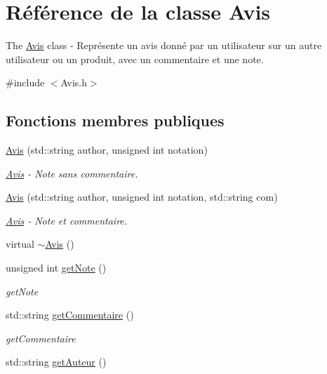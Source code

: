 \hypertarget{class_avis}{\section{Référence de la classe Avis}
\label{class_avis}
}


The \hyperlink{class_avis}{Avis} class -\/ Représente un avis donné par un utilisateur sur un autre utilisateur ou un produit, avec un commentaire et une note.  




{\ttfamily \#include $<$Avis.\-h$>$}

\subsection*{Fonctions membres publiques}
\begin{DoxyCompactItemize}
\item 
\hyperlink{class_avis_a93b6b6e8ce6e399a9dc017284063a841}{Avis} (std\-::string author, unsigned int notation)
\begin{DoxyCompactList}\small\item\em \hyperlink{class_avis}{Avis} -\/ Note sans commentaire. \end{DoxyCompactList}\item 
\hyperlink{class_avis_ada1766d4665eded0f8d582b366f56bfe}{Avis} (std\-::string author, unsigned int notation, std\-::string com)
\begin{DoxyCompactList}\small\item\em \hyperlink{class_avis}{Avis} -\/ Note et commentaire. \end{DoxyCompactList}\item 
virtual \hyperlink{class_avis_a00990e98a8bae6b1a40a5ff70fb1c62c}{$\sim$\-Avis} ()
\item 
unsigned int \hyperlink{class_avis_a38aac72b52990bbe4f7bcec663c560c6}{get\-Note} ()
\begin{DoxyCompactList}\small\item\em get\-Note \end{DoxyCompactList}\item 
std\-::string \hyperlink{class_avis_ae03e2b620c88bcc258821b8247529425}{get\-Commentaire} ()
\begin{DoxyCompactList}\small\item\em get\-Commentaire \end{DoxyCompactList}\item 
std\-::string \hyperlink{class_avis_a291d331943b1bcb18ee4290624f5a178}{get\-Auteur} ()

\end{DoxyCompactItemize}
